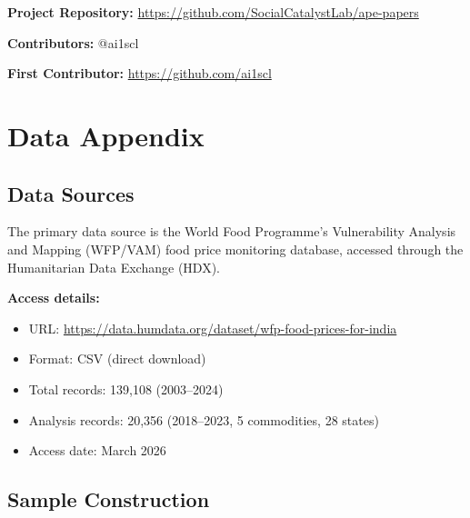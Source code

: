 \documentclass[12pt]{article}
\begin{document}
\noindent\textbf{Project Repository:} \url{https://github.com/SocialCatalystLab/ape-papers}

\noindent\textbf{Contributors:} @ai1scl

\noindent\textbf{First Contributor:} \url{https://github.com/ai1scl}

\label{apep_main_text_end}
\newpage


\newpage
\appendix

\section{Data Appendix}
\label{app:data}

\subsection{Data Sources}

The primary data source is the World Food Programme's Vulnerability Analysis and Mapping (WFP/VAM) food price monitoring database, accessed through the Humanitarian Data Exchange (HDX).

\textbf{Access details:}
\begin{itemize}
    \item URL: \url{https://data.humdata.org/dataset/wfp-food-prices-for-india}
    \item Format: CSV (direct download)
    \item Total records: 139,108 (2003--2024)
    \item Analysis records: 20,356 (2018--2023, 5 commodities, 28 states)
    \item Access date: March 2026
\end{itemize}

\subsection{Sample Construction}
\end{document}
